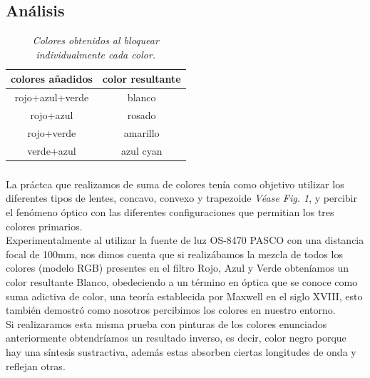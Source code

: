 \documentclass{article}
\begin{document}
\subsection{Análisis}

\begin{table}[h!]
\begin{center}
\begin{tabular}{ |c|c| } 
 \hline
 colores añadidos & color resultante  \\ 
 \hline
 rojo+azul+verde & blanco  \\ 
 rojo+azul & rosado  \\ 
 rojo+verde & amarillo  \\
 verde+azul & azul cyan  \\
 \hline
\end{tabular}
\caption{ \emph{Colores obtenidos al bloquear individualmente cada color.}}
\label{table:1}
\end{center}
\end{table}

\subsubsection{}

La práctca que realizamos de suma de colores tenía como objetivo utilizar los diferentes tipos de lentes, concavo, convexo y trapezoide \emph{Véase Fig. 1}, y percibir el fenómeno óptico con las diferentes configuraciones que permitian los tres colores primarios.
\\
Experimentalmente al utilizar la fuente de luz OS-8470 PASCO con una distancia focal de 100mm, nos dimos cuenta que si realizábamos la mezcla de todos los colores (modelo RGB) presentes en el filtro Rojo, Azul y Verde obteníamos un color resultante Blanco, obedeciendo a un término en óptica que se conoce como suma adictiva de color, una teoría establecida por Maxwell en el siglo XVIII, esto también demostró como nosotros percibimos los colores en nuestro entorno. 
\\
Si realizaramos esta misma prueba con pinturas de los colores enunciados anteriormente obtendríamos un resultado inverso, es decir, color negro porque hay una síntesis sustractiva, además estas absorben ciertas longitudes de onda y reflejan otras.   

\subsubsection{}
\end{document}
